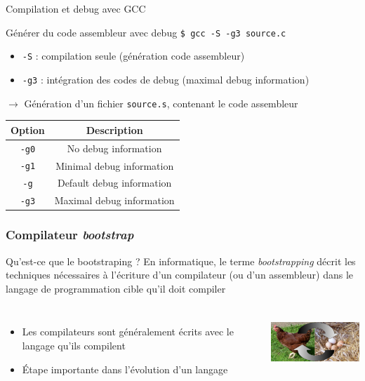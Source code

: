 \begin{frame}{Compilation et debug avec GCC}
\begin{exampleblock}{Générer du code assembleur avec debug}
\texttt{\$ gcc -S -g3 source.c}
\begin{itemize}
\item \texttt{-S} : compilation seule (génération code assembleur)
\item \texttt{-g3} : intégration des codes de debug (maximal debug information) 
\end{itemize}
$\rightarrow$ Génération d'un fichier \texttt{source.s}, contenant le code assembleur
\end{exampleblock}

\begin{table}[htdp]
\begin{center}
\begin{tabular}{|c|c|}
\hline
Option&Description\\
\hline
\texttt{-g0} & No debug information \\
\texttt{-g1} & Minimal debug information \\
\texttt{-g} & Default debug information \\
\texttt{-g3} & Maximal debug information \\
\hline
\end{tabular}
\end{center}
\end{table}

\end{frame}



\begin{frame}
\frametitle{Compilateur \textit{bootstrap}}
\begin{block}{Qu'est-ce que le bootstraping ?}
En informatique, le terme \emph{bootstrapping} décrit les techniques nécessaires à l'écriture d'un compilateur (ou d'un assembleur) dans le langage de programmation cible qu'il doit compiler
\end{block}

\begin{columns}
\begin{itemize}
\item Les compilateurs sont généralement écrits avec le langage qu'ils compilent
\item Étape importante dans l'évolution d'un langage
\end{itemize}
\includegraphics[height=2cm]{../illustration/Chickenegg.jpg}
\end{columns}
\end{frame}




